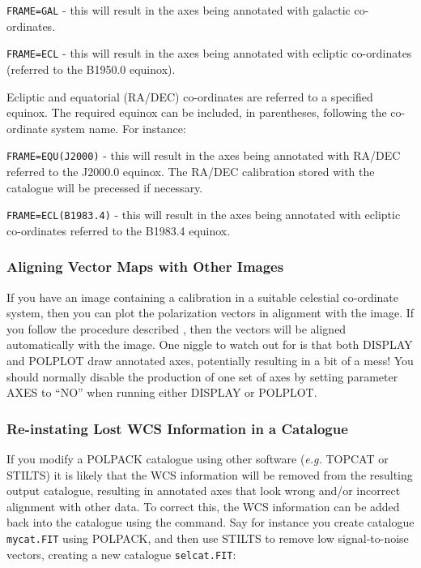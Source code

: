 \documentclass[twoside,11pt]{starlink}
\begin{document}
\verb+FRAME=GAL+ - this will result in the axes being annotated with
galactic co-ordinates.

\verb+FRAME=ECL+ - this will result in the axes being annotated with
ecliptic co-ordinates (referred to the B1950.0 equinox).

Ecliptic and equatorial (RA/DEC) co-ordinates are referred to a specified
equinox. The required equinox can be included, in parentheses, following the
co-ordinate system name. For instance:

\verb+FRAME=EQU(J2000)+ - this will result in the axes being annotated with
RA/DEC referred to the J2000.0 equinox. The RA/DEC calibration stored
with the catalogue will be precessed if necessary.

\verb+FRAME=ECL(B1983.4)+ - this will result in the axes being annotated with
ecliptic co-ordinates referred to the B1983.4 equinox.

\subsubsection {Aligning Vector Maps with Other Images}
If you have an image containing a
calibration in a suitable celestial co-ordinate system, then you can plot
the polarization vectors in alignment with the image. If you follow the
procedure described , then the
vectors will be aligned automatically with the image. One niggle to watch
out for is that both DISPLAY and POLPLOT draw annotated axes, potentially
resulting in a bit of a mess! You should normally disable the production of
one set of axes by setting parameter AXES to ``NO'' when running either
DISPLAY or POLPLOT.

\subsubsection {Re-instating Lost WCS Information in a Catalogue}
If you modify a POLPACK catalogue using other software (\emph{e.g.} TOPCAT
or STILTS) it is likely that the WCS information will be removed from the
resulting output catalogue, resulting in annotated axes that look wrong
and/or incorrect alignment with other data. To correct this, the WCS
information can be added back into the catalogue using the
 command. Say for instance you create
catalogue \texttt{mycat.FIT} using POLPACK, and then use STILTS to remove
low signal-to-noise vectors, creating a new catalogue \texttt{selcat.FIT}:
\end{document}
